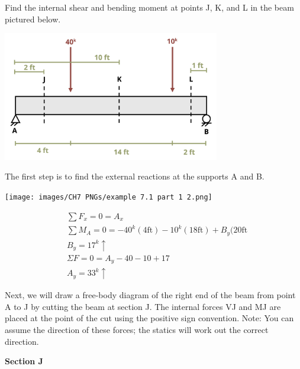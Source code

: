 \documentclass[
  letterpaper,
  DIV=11,
  numbers=noendperiod]{scrreprt}
\begin{document}
\begin{tcolorbox}[enhanced jigsaw, colback=white, colframe=quarto-callout-note-color-frame, leftrule=.75mm, opacitybacktitle=0.6, colbacktitle=quarto-callout-note-color!10!white, arc=.35mm, bottomrule=.15mm, breakable, title={Example 7.1 Simple internal shear and moment problem}, left=2mm, titlerule=0mm, toptitle=1mm, toprule=.15mm, opacityback=0, rightrule=.15mm, coltitle=black, bottomtitle=1mm]

Find the internal shear and bending moment at points J, K, and L in the
beam pictured below.

\begin{center}
\includegraphics[width=3.72917in,height=\textheight]{images/CH7 PNGs/example 7.1 part 1.png}
\end{center}

The first step is to find the external reactions at the supports A and
B.

\begin{center}
\texttt{[image: images/CH7 PNGs/example 7.1 part 1 2.png]}
\end{center}

\[
\begin{aligned}
& \sum F_x=0=A_x \\
& \sum M_A=0=-40^k(4\mathrm{ft})-10^k(18\mathrm{ft})+B_y(20 \mathrm{ft} \\
& B_y=17^k \uparrow \\
& \Sigma F=0=A_y-40-10+17 \\
& A_y=33^k \uparrow
\end{aligned}
\]

Next, we will draw a free-body diagram of the right end of the beam from
point A to J by cutting the beam at section J. The internal forces VJ
and MJ are placed at the point of the cut using the positive sign
convention. Note: You can assume the direction of these forces; the
statics will work out the correct direction.

\textbf{Section J}


\end{tcolorbox}
\end{document}
